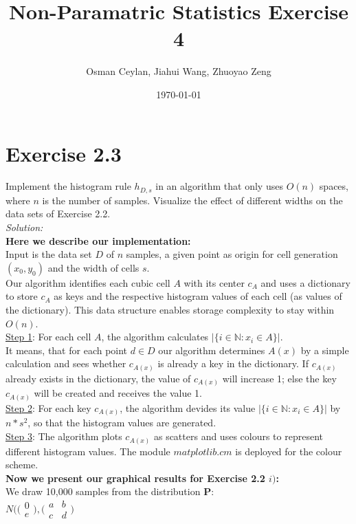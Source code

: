 \documentclass{article}
\title{Non-Paramatric Statistics Exercise 4}
\author{Osman Ceylan, Jiahui Wang, Zhuoyao Zeng}
\date{\today}
\begin{document}
\maketitle

\section*{Exercise 2.3} \vspace*{-1em}
Implement the histogram rule $h_{D,s}$ in an algorithm that only uses $O(n)$ spaces, where $n$ is the number of samples. Visualize the effect of different widths on the data sets of Exercise 2.2.\\
\textit{Solution: }\\
\textbf{Here we describe our implementation:}\\
Input is the data set $D$ of $n$ samples, a given point as origin for cell generation $(x_0,y_0)$ and the width of cells $s$.\\
Our algorithm identifies each cubic cell $A$ with its center $c_A$ and uses a dictionary to store $c_A$ as keys and the respective histogram values of each cell (as values of the dictionary). This data structure enables storage complexity to stay within $O(n)$.\\
\underline{Step 1}: For each cell $A$, the algorithm calculates $|\{ i\in \mathbb{N} : x_i\in A\}|$. \\
It means, that for each point $d \in D$ our algorithm determines $A(x)$ by a simple calculation and sees whether $c_{A(x)}$ is already a key in the dictionary. If $c_{A(x)}$ already exists in the dictionary, the value of $c_{A(x)}$ will increase 1; else the key $c_{A(x)}$ will be created and receives the value 1.\\
\underline{Step 2}: For each key $c_{A(x)}$, the algorithm devides its value $|\{ i\in \mathbb{N} : x_i\in A\}|$ by $n * s^2$, so that the histogram values are generated. \\
\underline{Step 3}: The algorithm plots $c_{A(x)}$ as scatters and uses colours to represent different histogram values. The module $matplotlib.cm$ is deployed for the colour scheme. \\
\textbf{Now we present our graphical results for Exercise 2.2 $i)$:} \\
We draw 10,000 samples from the distribution $\mathbf{P}$: \\
$ N ( \bigl(\begin{smallmatrix} 0 \\ e \end{smallmatrix}\bigr), \bigl(\begin{smallmatrix} a & b\\ c & d \end{smallmatrix}\bigr)$
\end{document}
